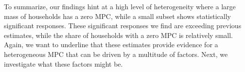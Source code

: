 To summarize, our findings hint at a high level of heterogeneity where a large mass of households has a zero MPC, while a small subset shows statistically significant responses. These significant responses we find are exceeding previous estimates, while the share of households with a zero MPC is relatively small. Again, we want to underline that these estimates provide evidence for a heterogeneous MPC that can be driven by a multitude of factors. Next, we investigate what these factors might be. 